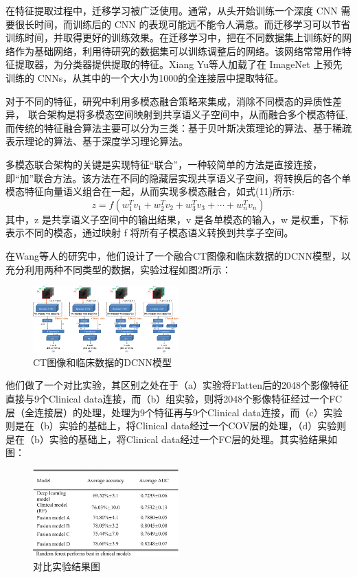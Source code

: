 \documentclass[journal,twoside,web]{ieeecolor}
\begin{document}
在特征提取过程中，迁移学习被广泛使用。通常，从头开始训练一个深度 CNN 需要很长时间，而训练后的 CNN 的表现可能远不能令人满意。而迁移学习可以节省训练时间，并取得更好的训练效果。在迁移学习中，把在不同数据集上训练好的网络作为基础网络，利用待研究的数据集可以训练调整后的网络。该网络常常用作特征提取器，为分类器提供提取的特征。Xiang Yu等人加载了在 ImageNet 上预先训练的 CNNs，从其中的一个大小为1000的全连接层中提取特征。

对于不同的特征，研究中利用多模态融合策略来集成，消除不同模态的异质性差异， 联合架构是将多模态空间映射到共享语义子空间中，从而融合多个模态特征,而传统的特征融合算法主要可以分为三类：基于贝叶斯决策理论的算法、基于稀疏表示理论的算法、基于深度学习理论算法。

多模态联合架构的关键是实现特征“联合”，一种较简单的方法是直接连接，即“加”联合方法。该方法在不同的隐藏层实现共享语义子空间，将转换后的各个单模态特征向量语义组合在一起，从而实现多模态融合，如式(11)所示:
\begin{equation}
    z=f\left(w_{1}^{T} v_{1}+w_{2}^{T} v_{2}+w_{3}^{T} v_{3}+\cdots+w_{n}^{T} v_{n}\right)
\end{equation}
其中，z 是共享语义子空间中的输出结果，v 是各单模态的输入，w 是权重，下标表示不同的模态，通过映射 f 将所有子模态语义转换到共享子空间。

在Wang等人的研究中，他们设计了一个融合CT图像和临床数据的DCNN模型，以充分利用两种不同类型的数据，实验过程如图2所示：
\begin{figure}
\centering
\includegraphics[width=0.5\textwidth]{img/fig4.png}
\caption{CT图像和临床数据的DCNN模型}
\label{fig:CT_DCNN}
\end{figure}

他们做了一个对比实验，其区别之处在于（a）实验将Flatten后的2048个影像特征直接与9个Clinical data连接，而（b）组实验，则将2048个影像特征经过一个FC层（全连接层）的处理，处理为9个特征再与9个Clinical data连接，而（c）实验则是在（b）实验的基础上，将Clinical data经过一个COV层的处理，（d）实验则是在（b）实验的基础上，将Clinical data经过一个FC层的处理。其实验结果如图：
\begin{figure}[h]
\centering
\includegraphics[width=0.5\textwidth]{img/fig5.png}
\caption{对比实验结果图}
\label{fig:result}
\end{figure}
\end{document}
